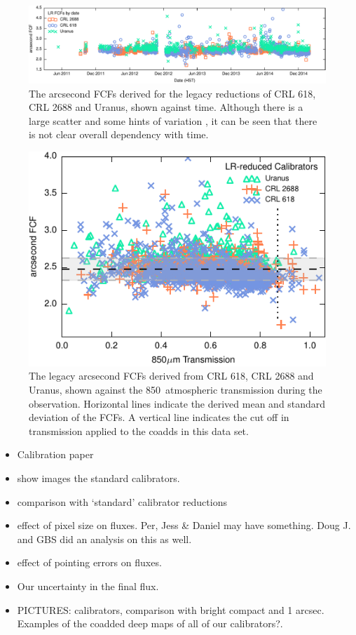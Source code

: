 \documentclass[twocolumn]{aastex6}
\begin{document}
\begin{figure}
\includegraphics{legacyFCF-vs-date.pdf}
\caption{The arcsecond FCFs derived for the legacy reductions of CRL
  618, CRL 2688 and Uranus, shown against time. Although there is a
  large scatter and some hints of variation , it can be seen that there is not
  clear overall dependency with time.\label{fig:fcfdate}}
\end{figure}
\begin{figure}
\includegraphics{legacyFCF-vs-transmission.pdf}
\caption{The legacy arcsecond FCFs derived from CRL 618, CRL 2688 and
  Uranus, shown against the 850\micron\ atmospheric transmission
  during the observation. Horizontal lines indicate the derived mean
  and standard deviation of the FCFs. A vertical line indicates the
  cut off in transmission applied to the coadds in this data
  set. \label{fig:fcftransmission}}
\end{figure}


\begin{itemize}
\item Calibration paper \citep{Dempsey2013}
\item show images the standard calibrators.
\item comparison with `standard' calibrator reductions
\item effect of pixel size on fluxes. Per, Jess \& Daniel may have
  something. Doug J. and GBS did an analysis on this as well.
\item effect of pointing errors on fluxes.
\item Our uncertainty in the final flux.

\item PICTURES: calibrators, comparison with bright compact and 1
  arcsec. Examples of the coadded deep maps of all of our
  calibrators?.
\end{itemize}
\end{document}
